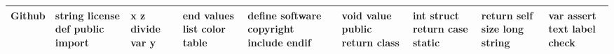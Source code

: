 \documentclass[11pt,a4paper]{article}
\begin{document}
\begin{appendices}
\begin{table*}[htb]
\begin{tiny}
\begin{tabular}{|p{}|p{}|p{}|p{}|p{}|p{}|p{}|p{}|p{}|}
    Github & string \newline license \newline def \newline public \newline import & x \newline z \newline divide \newline var \newline y & end \newline values \newline list \newline color \newline table & define \newline software \newline copyright \newline include \newline endif & void \newline value \newline public \newline return \newline class & int \newline struct \newline return \newline case \newline static & return \newline self \newline size \newline long \newline string & var \newline assert \newline text \newline label \newline check\\\hline

\end{tabular}
\end{tiny}
\end{table*}
\end{appendices}
\end{document}
